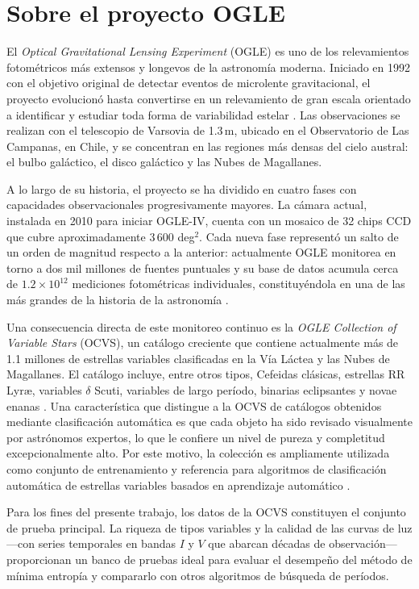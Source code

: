 \documentclass[12pt,letterpaper,oneside]{book}
\begin{document}
\section{Sobre el proyecto OGLE}

El \textit{Optical Gravitational Lensing Experiment} (OGLE) es uno de los relevamientos fotométricos más extensos y longevos de la astronomía moderna. Iniciado en 1992 con el objetivo original de detectar eventos de microlente gravitacional, el proyecto evolucionó hasta convertirse en un relevamiento de gran escala orientado a identificar y estudiar toda forma de variabilidad estelar \citep{ogle2024}. Las observaciones se realizan con el telescopio de Varsovia de 1.3\,m, ubicado en el Observatorio de Las Campanas, en Chile, y se concentran en las regiones más densas del cielo austral: el bulbo galáctico, el disco galáctico y las Nubes de Magallanes.

A lo largo de su historia, el proyecto se ha dividido en cuatro fases con capacidades observacionales progresivamente mayores. La cámara actual, instalada en 2010 para iniciar OGLE-IV, cuenta con un mosaico de 32 chips CCD que cubre aproximadamente 3\,600 deg$^{2}$. Cada nueva fase representó un salto de un orden de magnitud respecto a la anterior: actualmente OGLE monitorea en torno a dos mil millones de fuentes puntuales y su base de datos acumula cerca de $1.2 \times 10^{12}$ mediciones fotométricas individuales, constituyéndola en una de las más grandes de la historia de la astronomía \citep{ogle2024}.

Una consecuencia directa de este monitoreo continuo es la \textit{OGLE Collection of Variable Stars} (OCVS), un catálogo creciente que contiene actualmente más de 1.1 millones de estrellas variables clasificadas en la Vía Láctea y las Nubes de Magallanes. El catálogo incluye, entre otros tipos, Cefeidas clásicas, estrellas RR Lyr\ae{}, variables $\delta$ Scuti, variables de largo período, binarias eclipsantes y novae enanas \citep{ogle2024}. Una característica que distingue a la OCVS de catálogos obtenidos mediante clasificación automática es que cada objeto ha sido revisado visualmente por astrónomos expertos, lo que le confiere un nivel de pureza y completitud excepcionalmente alto. Por este motivo, la colección es ampliamente utilizada como conjunto de entrenamiento y referencia para algoritmos de clasificación automática de estrellas variables basados en aprendizaje automático \citep{ogle2024}.

Para los fines del presente trabajo, los datos de la OCVS constituyen el conjunto de prueba principal. La riqueza de tipos variables y la calidad de las curvas de luz —con series temporales en bandas $I$ y $V$ que abarcan décadas de observación— proporcionan un banco de pruebas ideal para evaluar el desempeño del método de mínima entropía y compararlo con otros algoritmos de búsqueda de períodos.
	
\end{document}
